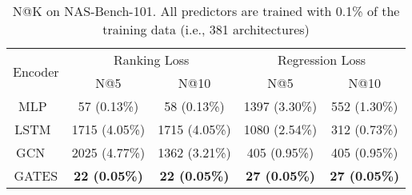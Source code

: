 \documentclass[runningheads]{llncs}
\begin{document}
\begin{table*}[tb]
\caption{The Kendall’s Tau of using different encoders on the NAS-Bench-101 dataset. The first 90\% (381262) architectures in the dataset are used as the training data, and the other 42362 architectures are used as the testing data}
  
\label{table:gates-nb101}
\begin{center}
\end{center}
\end{table*}


\begin{table*}[th]
    \caption{N@K on NAS-Bench-101. All predictors are trained with 0.1\% of the training data (i.e., 381 architectures)}
    \label{table:natk-nb101}
    \begin{center}
    \begin{tabular}{c@{\hskip 0.02\linewidth}cccc}
    \toprule
    \multirow{2}{*}{Encoder} & \multicolumn{2}{c}{Ranking Loss} &  \multicolumn{2}{c}{Regression Loss} \\ 
    \cmidrule(lr){2-3}\cmidrule(lr){4-5} & N@5 & N@10 & N@5 & N@10  \\ \midrule
    MLP~\cite{wang2018alphax}   &    57 (0.13\%)    &    58 (0.13\%)   &    1397 (3.30\%)   &   552 (1.30\%)    \\
    LSTM~\cite{wang2018alphax}     &      1715 (4.05\%)  &   1715 (4.05\%) &   1080 (2.54\%)   & 312 (0.73\%)  \\
    GCN ~\cite{shi2019multi} & 2025 (4.77\%) & 1362 (3.21\%) & 405 (0.95\%) & 405 (0.95\%) \\
    \hline
    GATES & {\bf 22 (0.05\%)} & {\bf 22 (0.05\%)} & {\bf 27 (0.05\%)} & {\bf 27 (0.05\%)} \\\bottomrule
    \end{tabular}
\end{center}
\end{table*}
\end{document}
